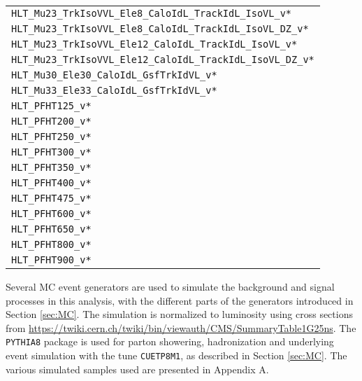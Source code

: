 \begin{table}[htbp!]
\begin{center}
\begin{tabular}{ l}
        \texttt{HLT\_Mu23\_TrkIsoVVL\_Ele8\_CaloIdL\_TrackIdL\_IsoVL\_v*}    \\ 
        \texttt{HLT\_Mu23\_TrkIsoVVL\_Ele8\_CaloIdL\_TrackIdL\_IsoVL\_DZ\_v*} \\
        \texttt{HLT\_Mu23\_TrkIsoVVL\_Ele12\_CaloIdL\_TrackIdL\_IsoVL\_v*}    \\ 
        \texttt{HLT\_Mu23\_TrkIsoVVL\_Ele12\_CaloIdL\_TrackIdL\_IsoVL\_DZ\_v*}    \\ 
        \texttt{HLT\_Mu30\_Ele30\_CaloIdL\_GsfTrkIdVL\_v*}            \\
        \texttt{HLT\_Mu33\_Ele33\_CaloIdL\_GsfTrkIdVL\_v*}            \\
        \texttt{HLT\_PFHT125\_v*}                       \\
        \texttt{HLT\_PFHT200\_v*}                       \\
        \texttt{HLT\_PFHT250\_v*}                       \\
        \texttt{HLT\_PFHT300\_v*}                       \\
        \texttt{HLT\_PFHT350\_v*}                       \\
        \texttt{HLT\_PFHT400\_v*}                       \\
        \texttt{HLT\_PFHT475\_v*}                       \\
        \texttt{HLT\_PFHT600\_v*}                       \\
        \texttt{HLT\_PFHT650\_v*}                       \\
        \texttt{HLT\_PFHT800\_v*}                       \\
        \texttt{HLT\_PFHT900\_v*}                       \\
\hline\hline
\end{tabular}
\end{center}
\end{table}                                                                                                          
\newpara
\noindent\justify
Several MC event generators are used to simulate the background and signal processes in this analysis, with the different parts of the generators introduced in Section \ref{sec:MC}. 
The simulation is normalized to luminosity using cross sections from \url{https://twiki.cern.ch/twiki/bin/viewauth/CMS/SummaryTable1G25ns}.
The \texttt{PYTHIA8} \cite{Sjostrand:2006za} package is used for parton showering, hadronization and underlying event simulation with the tune \texttt{CUETP8M1}, as described in Section \ref{sec:MC}.
The various simulated samples used are presented in Appendix A.  
